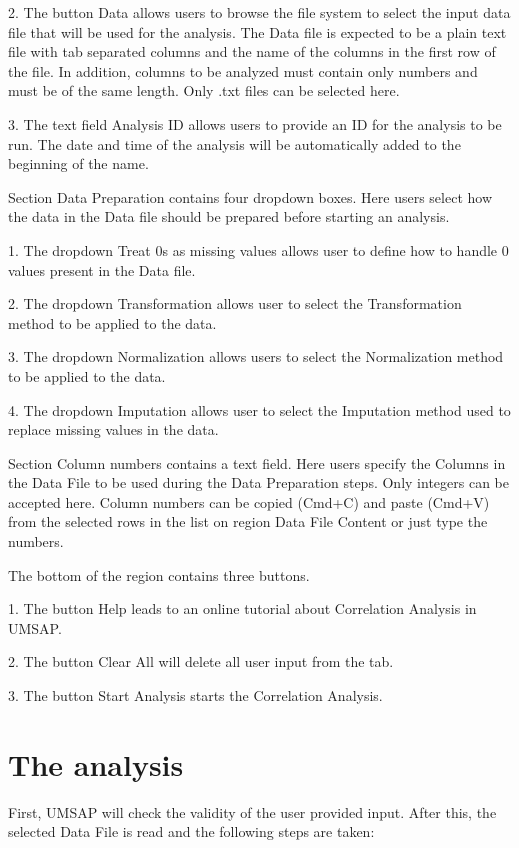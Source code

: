 \num{2}. The button Data allows users to browse the file system to select the input
data file that will be used for the analysis. The Data file is expected to be a
plain text file with tab separated columns and the name of the columns in the first
row of the file. In addition, columns to be analyzed must contain only numbers and
must be of the same length. Only .txt files can be selected here.

\num{3}. The text field Analysis ID allows users to provide an ID for the analysis
to be run. The date and time of the analysis will be automatically added to the
beginning of the name.

Section Data Preparation contains four dropdown boxes. Here users select how the data
in the Data file should be prepared before starting an analysis.

\num{1}. The dropdown Treat \num{0}s as missing values allows user to define how
to handle \num{0} values present in the Data file.

\num{2}. The dropdown Transformation allows user to select the Transformation method
to be applied to the data.

\num{3}. The dropdown Normalization allows users to select the Normalization method
to be applied to the data.

\num{4}. The dropdown Imputation allows user to select the Imputation method used
to replace missing values in the data.

Section Column numbers contains a text field. Here users specify the Columns in the
Data File to be used during the Data Preparation steps. Only integers can be accepted
here. Column numbers can be copied (Cmd+C) and paste (Cmd+V) from the selected rows
in the list on region Data File Content or just type the numbers.

The bottom of the region contains three buttons.

\num{1}. The button Help leads to an online tutorial about Correlation Analysis in
UMSAP.

\num{2}. The button Clear All will delete all user input from the tab.

\num{3}. The button Start Analysis starts the Correlation Analysis.

\section{The analysis}

First, UMSAP will check the validity of the user provided input. After this, the
selected Data File is read and the following steps are taken:

